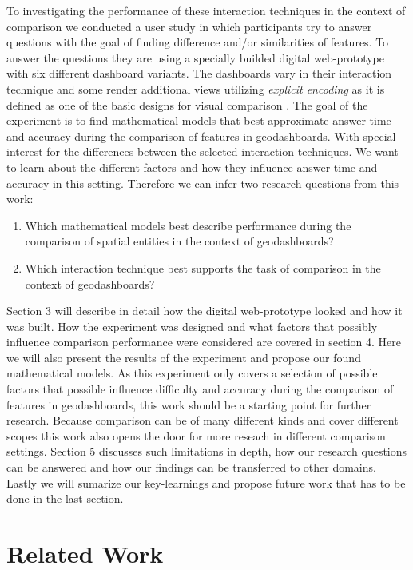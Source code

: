 \documentclass[12pt, twoside]{article}
\begin{document}
To investigating the performance of these interaction techniques in the context of comparison we
conducted a user study in which participants try to answer questions with the goal of finding
difference and/or similarities of features. To answer the questions they are using a specially 
builded digital web-prototype with six different dashboard variants. The dashboards vary in their
interaction technique and some render additional views utilizing \textit{explicit encoding} as it
is defined as one of the basic designs for visual comparison \citep*{Gleicher.2018}. The goal of
the experiment is to find mathematical models that best approximate answer time and accuracy during 
the comparison of features in geodashboards. With special interest for the differences between the
selected interaction techniques. We want to learn about the different factors and how they influence
answer time and accuracy in this setting. Therefore we can infer two research questions from this work:
\begin{enumerate}
    \item Which mathematical models best describe performance during the comparison of spatial entities
    in the context of geodashboards?
    \item Which interaction technique best supports the task of comparison in the context of
    geodashboards? 
\end{enumerate}
Section 3 will describe in detail how the digital web-prototype looked and how it was built. How the
experiment was designed and what factors that possibly influence comparison performance were considered
are covered in section 4. Here we will also present the results of the experiment and propose our found
mathematical models.
As this experiment only covers a selection of possible factors that possible influence difficulty and
accuracy during the comparison of features in geodashboards, this work should be a starting point for
further research. Because comparison can be of many different kinds and cover different scopes this work
also opens the door for more reseach in different comparison settings. Section 5 discusses such limitations
in depth, how our research questions can be answered and how our findings can be transferred to other domains.
Lastly we will sumarize our key-learnings and propose future work that has to be done in the last section.


\section{Related Work}
\end{document}
